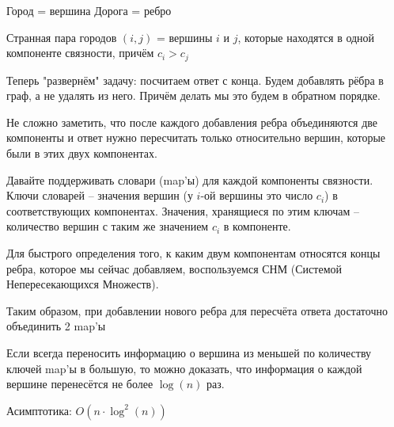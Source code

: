 \solutionSection

{Город = вершина}
{Дорога = ребро}

Странная пара городов $(i, j)$ = вершины $i$ и $j$, которые
находятся в одной компоненте связности, причём $c_i > c_j$

Теперь "развернём" задачу: посчитаем ответ с конца.
Будем добавлять рёбра в граф, а не удалять из него.
Причём делать мы это будем в обратном порядке.

Не сложно заметить, что после каждого добавления ребра
объединяются две компоненты и ответ нужно пересчитать только
относительно вершин, которые были в этих двух компонентах.

Давайте поддерживать словари (map’ы) для каждой компоненты связности.
Ключи словарей – значения вершин (у $i$-ой вершины это число $c_i$)
в соответствующих компонентах.
Значения, хранящиеся по этим ключам – количество вершин с таким же
значением $c_i$ в компоненте.

Для быстрого определения того, к каким двум компонентам относятся
концы ребра, которое мы сейчас добавляем, воспользуемся СНМ
(Системой Непересекающихся Множеств).

Таким образом, при добавлении нового ребра для пересчёта ответа достаточно
объединить 2 map’ы

Если всегда переносить информацию о вершина из меньшей по количеству
ключей map’ы в большую, то можно доказать, что информация о каждой
вершине перенесётся не более $\log(n)$ раз.

Асимптотика: $O(n \cdot \log^{2}(n))$

\codeExample

